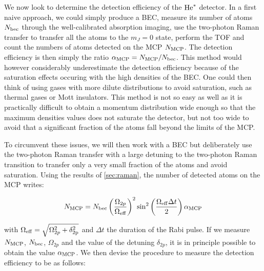 \label{sec:detection_efficiency}

We now look to determine the detection efficiency of the $\mathrm{He}^*$ detector. In a first naive approach, we could simply produce a BEC, measure its number of atoms $N_{\rm{bec}}$ through the well-calibrated absorption imaging, use the two-photon Raman transfer to transfer all the atoms to the $m_J=0$ state, perform the TOF and count the numbers of atoms detected on the MCP $N_{\rm{MCP}}$. The detection efficiency is then simply the ratio $\alpha_{\rm{MCP}}= N_{\rm{MCP}}/N_{\rm{bec}}$. This method would however considerably underestimate the detection efficiency because of the saturation effects occuring with the high densities of the BEC. One could then think of using gases with more dilute distributions to avoid saturation, such as thermal gases or Mott insulators. This method is not so easy as well as it is practically difficult to obtain a momentum distribution wide enough so that the maximum densities values does not saturate the detector, but not too wide to avoid that a significant fraction of the atoms fall beyond the limits of the MCP.

To circumvent these issues, we will then work with a BEC but deliberately use the two-photon Raman transfer with a large detuning to the two-photon Raman transition to transfer only a very small fraction of the atoms and avoid saturation. Using the results of \ref{sec:raman}, the number of detected atoms on the MCP writes:

\begin{equation}
    N_{\rm{MCP}}=N_{\rm{bec}} \left(\frac{\Omega_{2 p}}{\Omega_{\rm{eff}}}\right)^{2} \sin ^{2}\left(\frac{\Omega_{\rm{eff}}  \Delta t}{2}\right) \alpha_{\rm{MCP}}
\end{equation}

\noindent with  $\Omega_{\rm{eff}}= \sqrt{\Omega_{2p}^2 + \delta_{\rm{2p}}^2}$ and $\Delta t$ the duration of the Rabi pulse. If we measure $N_{\rm{MCP}}$, $N_{\rm{bec}}$, $\Omega_{2p}$ and the value of the detuning  $\delta_{2p}$, it is in principle possible to obtain the value $\alpha_{\rm{MCP}}$. We then devise the procedure to measure the detection efficiency to be as follows:

